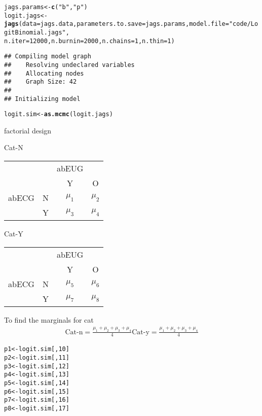 \documentclass[12pt,letterpaper,oneside]{article}\usepackage{graphicx, color}
\makeatletter
\newcommand{\hlfunctioncall}[1]{\textcolor[rgb]{0.501960784313725,0,0.329411764705882}{\textbf{#1}}}%
\newcommand{\hlstring}[1]{\textcolor[rgb]{0.6,0.6,1}{#1}}%
\newenvironment{kframe}{%
 \def\at@end@of@kframe{}%
 \ifinner\ifhmode%
  \def\at@end@of@kframe{\end{minipage}}%
  \begin{minipage}{\columnwidth}%
 \fi\fi%
 \def\FrameCommand##1{\hskip\@totalleftmargin \hskip-\fboxsep
 \colorbox{shadecolor}{##1}\hskip-\fboxsep
     \hskip-\linewidth \hskip-\@totalleftmargin \hskip\columnwidth}%
 \MakeFramed {\advance\hsize-\width
   \@totalleftmargin\z@ \linewidth\hsize
   \@setminipage}}%
 {\par\unskip\endMakeFramed%
 \at@end@of@kframe}
\newenvironment{knitrout}{}{} %
\makeatother
\begin{document}
\begin{knitrout}\scriptsize
{}\color{fgcolor}\begin{kframe}
\begin{alltt}
jags.params <- \hlfunctioncall{c}(\hlstring{"b"}, \hlstring{"p"})
logit.jags <- \hlfunctioncall{jags}(data = jags.data, parameters.to.save = jags.params, model.file = \hlstring{"code/LogitBinomial.jags"}, 
    n.iter = 12000, n.burnin = 2000, n.chains = 1, n.thin = 1)
\end{alltt}
\begin{verbatim}
## Compiling model graph
##    Resolving undeclared variables
##    Allocating nodes
##    Graph Size: 42
## 
## Initializing model
\end{verbatim}
\begin{alltt}
logit.sim <- \hlfunctioncall{as.mcmc}(logit.jags)
\end{alltt}
\end{kframe}
\end{knitrout}

factorial design

Cat-N
\begin{tabular}{cccc}
      &  & abEUG & \\
      &  & Y & O\\
abECG & N & $\mu_1$ & $\mu_2$ \\
      & Y & $\mu_3$ & $\mu_4$ \\
\end{tabular}

Cat-Y
\begin{tabular}{cccc}
      &  & abEUG & \\
      &  & Y & O\\
abECG & N & $\mu_5$ & $\mu_6$ \\
      & Y & $\mu_7$ & $\mu_8$ \\
\end{tabular}

To find the marginals for cat
\begin{align}
    \text{Cat-n} = \frac{\mu_1+\mu_2+\mu_3+\mu_4}{4}
    \text{Cat-y} = \frac{\mu_1+\mu_2+\mu_3+\mu_4}{4}
\end{align}
\begin{knitrout}\scriptsize
{}\color{fgcolor}\begin{kframe}
\begin{alltt}
p1 <- logit.sim[, 10]
p2 <- logit.sim[, 11]
p3 <- logit.sim[, 12]
p4 <- logit.sim[, 13]
p5 <- logit.sim[, 14]
p6 <- logit.sim[, 15]
p7 <- logit.sim[, 16]
p8 <- logit.sim[, 17]
\end{alltt}
\end{kframe}
\end{knitrout}
\end{document}
